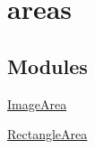 \hypertarget{group__areas}{
\section{areas}
\label{dd/d8d/group__areas}
}
\subsection*{Modules}
\begin{DoxyCompactItemize}
\item 
\hyperlink{group___image_area}{ImageArea}
\item 
\hyperlink{group___rectangle_area}{RectangleArea}
\end{DoxyCompactItemize}
